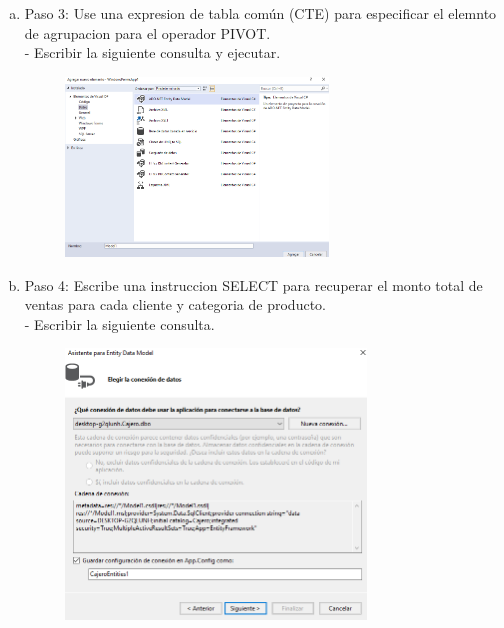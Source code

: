 \begin{enumerate}[1.]
\begin{enumerate}[a)]
\begin{figure}[H]
\begin{center}
		\end{center}
		\end{figure}
	\item Paso 3: Use una expresion de tabla común (CTE) para especificar el elemnto de agrupacion para el operador PIVOT.\\
		-  Escribir la siguiente consulta y ejecutar. 
		\begin{figure}[H]
		\begin{center}
		\includegraphics[width=7cm]{./Imagenes/img6}
		\end{center}
		\end{figure}
	\item Paso 4: Escribe una instruccion SELECT para recuperar el monto total de ventas para cada cliente y categoria de producto.\\
		-  Escribir la siguiente consulta. 
		\begin{figure}[H]
		\begin{center}
		\includegraphics[width=8cm]{./Imagenes/img7}
		\end{center}
		\end{figure}
	\end{enumerate}
\end{enumerate}





